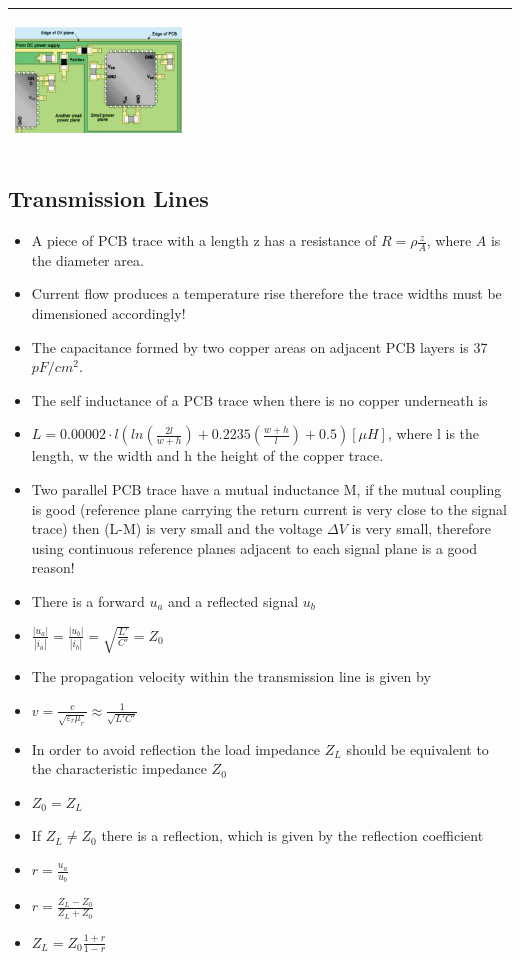 \begin{table}[h!]
\begin{tabular}{|m{}|m{}|}
					\begin{center}\includegraphics[width=0.35\textwidth]{images/FerriteDecouple2.png}\end{center} 
			\\
			\hline
			\end{tabular}
		\end{table}
	\clearpage
	\subsection{Transmission Lines}
		\begin{itemize}
			\setlength{\itemsep}{-4pt}
			\item A piece of PCB trace with a length z has a resistance of $R = \rho \frac{z}{A}$, where $A$ is the diameter area. 
			\item Current flow produces a temperature rise therefore the trace widths must be dimensioned accordingly!
			\item The capacitance formed by two copper areas on adjacent PCB layers is 37 $pF/cm^2$. 
			\item The self inductance of a PCB trace when there is no copper underneath is 
			\item[] $L = 0.00002\cdot l \left(ln\left(\frac{2l}{w+h}\right)+ 0.2235\left(\frac{w+h}{l}\right)+0.5\right) [\mu H]$, where l is the length, w the width and h the height of the copper trace. 
			\item Two parallel PCB trace have a mutual inductance M, if the mutual coupling is good (reference plane carrying the return current is very close to the signal trace) then (L-M) is very small and the voltage $\Delta V$ is very small, therefore using continuous reference planes adjacent to each signal plane is a good reason! 
			\item There is a forward $u_a$ and a reflected signal $u_b$
			\item[] $\frac{|u_a|}{|i_a|} = \frac{|u_b|}{|i_b|} = \sqrt{\frac{L'}{C'}} = Z_0$
			\item The propagation velocity within the transmission line is given by
			\item[] $v = \frac{c}{\sqrt{\varepsilon_r \mu_r}} \approx \frac{1}{\sqrt{L' C'}}$
			\item In order to avoid reflection the load impedance $Z_L$ should be equivalent to the characteristic impedance $Z_0$
			\item[] $Z_0 = Z_L$
			\item If $Z_L \neq Z_0$ there is a reflection, which is given by the reflection coefficient
			\item[] $r = \frac{u_a}{u_b}$
			\item[] $r = \frac{Z_L - Z_0}{Z_L + Z_0}$
			\item[] $Z_L = Z_0 \frac{1+r}{1-r}$
		\end{itemize}
